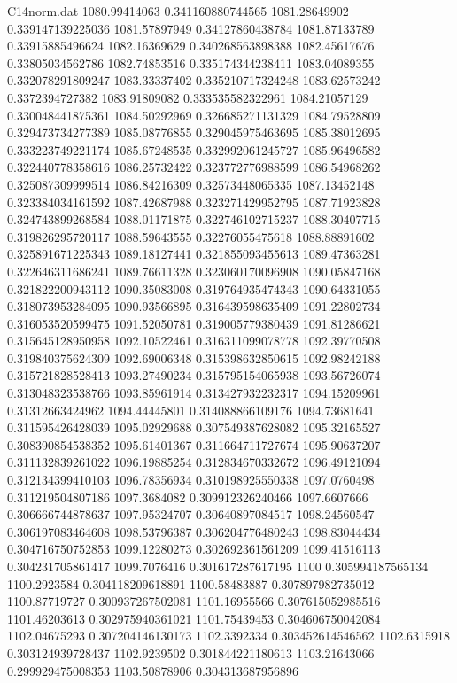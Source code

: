 \begin{filecontents}{C14norm.dat}
1080.99414063			0.341160880744565
1081.28649902			0.339147139225036
1081.57897949			0.34127860438784
1081.87133789			0.33915885496624
1082.16369629			0.340268563898388
1082.45617676			0.33805034562786
1082.74853516			0.335174344238411
1083.04089355			0.332078291809247
1083.33337402			0.335210717324248
1083.62573242			0.3372394727382
1083.91809082			0.333535582322961
1084.21057129			0.330048441875361
1084.50292969			0.326685271131329
1084.79528809			0.329473734277389
1085.08776855			0.329045975463695
1085.38012695			0.333223749221174
1085.67248535			0.332992061245727
1085.96496582			0.322440778358616
1086.25732422			0.323772776988599
1086.54968262			0.325087309999514
1086.84216309			0.32573448065335
1087.13452148			0.323384034161592
1087.42687988			0.323271429952795
1087.71923828			0.324743899268584
1088.01171875			0.322746102715237
1088.30407715			0.319826295720117
1088.59643555			0.32276055475618
1088.88891602			0.325891671225343
1089.18127441			0.321855093455613
1089.47363281			0.322646311686241
1089.76611328			0.323060170096908
1090.05847168			0.321822200943112
1090.35083008			0.319764935474343
1090.64331055			0.318073953284095
1090.93566895			0.316439598635409
1091.22802734			0.316053520599475
1091.52050781			0.319005779380439
1091.81286621			0.315645128950958
1092.10522461			0.316311099078778
1092.39770508			0.319840375624309
1092.69006348			0.315398632850615
1092.98242188			0.315721828528413
1093.27490234			0.315795154065938
1093.56726074			0.313048323538766
1093.85961914			0.313427932232317
1094.15209961			0.31312663424962
1094.44445801			0.314088866109176
1094.73681641			0.311595426428039
1095.02929688			0.307549387628082
1095.32165527			0.308390854538352
1095.61401367			0.311664711727674
1095.90637207			0.311132839261022
1096.19885254			0.312834670332672
1096.49121094			0.312134399410103
1096.78356934			0.310198925550338
1097.0760498			0.311219504807186
1097.3684082			0.309912326240466
1097.6607666			0.306666744878637
1097.95324707			0.30640897084517
1098.24560547			0.306197083464608
1098.53796387			0.306204776480243
1098.83044434			0.304716750752853
1099.12280273			0.302692361561209
1099.41516113			0.304231705861417
1099.7076416			0.301617287617195
1100			0.305994187565134
1100.2923584			0.304118209618891
1100.58483887			0.307897982735012
1100.87719727			0.300937267502081
1101.16955566			0.307615052985516
1101.46203613			0.302975940361021
1101.75439453			0.304606750042084
1102.04675293			0.307204146130173
1102.3392334			0.303452614546562
1102.6315918			0.303124939728437
1102.9239502			0.301844221180613
1103.21643066			0.299929475008353
1103.50878906			0.304313687956896

\end{filecontents}
